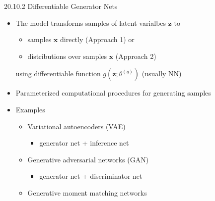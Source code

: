 \documentclass[dvipdfmx,presentation]{beamer}
\def\bf{\mathbf}
\begin{document}
\begin{frame}[label={sec:orgheadline14}]{20.10.2 Differentiable Generator Nets}
\begin{itemize}
\item The model transforms samples of latent varialbes \(\bf{z}\) to 
\begin{itemize}
\item samples \(\bf{x}\) directly (Approach 1) or
\item distributions over samples \(\bf{x}\) (Approach 2)
\end{itemize}
using differentiable function \(g(\bf{z}; \theta^{(g)})\) (usually NN)
\item Parameterized computational procedures for generating samples
\item Examples
\begin{itemize}
\item Variational autoencoders (VAE)
\begin{itemize}
\item generator net + inference net
\end{itemize}
\item Generative adversarial networks (GAN)
\begin{itemize}
\item generator net + discriminator net
\end{itemize}
\item Generative moment matching networks
\end{itemize}
\end{itemize}
\end{frame}
\end{document}
